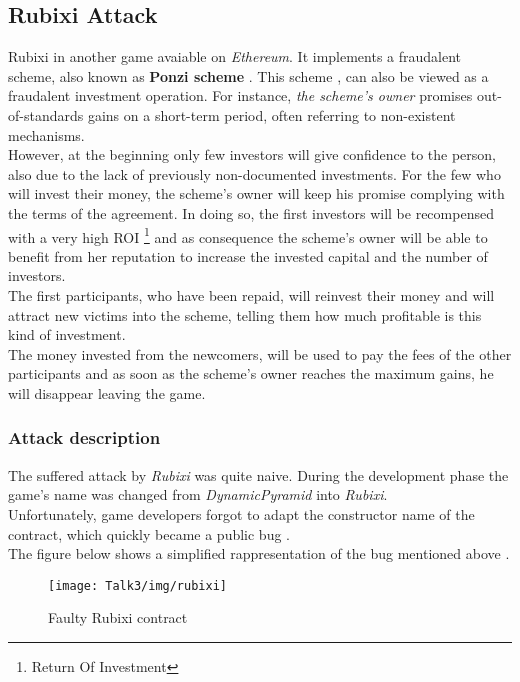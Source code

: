 \subsection{Rubixi Attack}
Rubixi \cite{rubixi1, rubixi2} in another game avaiable on \textit{Ethereum}. It implements a fraudalent scheme, also known as \textbf{Ponzi scheme} \cite{paper2}.
This scheme \cite{ponzi}, can also be viewed as a fraudalent investment operation. For instance, \textit{the scheme's owner} promises out-of-standards gains on a short-term period, often referring to non-existent mechanisms. \\ 
However, at the beginning only few investors will give confidence to the person, also due to the lack of previously non-documented investments. 
For the few who will invest their money, the scheme's owner will keep his promise complying with the terms of the agreement. In doing so, the first investors will be recompensed with a very high ROI \footnote{Return Of Investment} and as consequence the scheme's owner will be able to benefit from her reputation to increase the invested capital and the number of investors. \\
The first participants, who have been repaid, will reinvest their money and will attract new victims into the scheme, telling them how much profitable is this kind of investment. \\
The money invested from the newcomers, will be used to pay the fees of the other participants and as soon as the scheme's owner reaches the maximum gains, he will disappear leaving the game. \\
\subsubsection{Attack description}
The suffered attack by \textit{Rubixi} was quite naive. During the development phase the game's name was changed from \textit{DynamicPyramid} into \textit{Rubixi}. \\
Unfortunately, game developers forgot to adapt the constructor name of the contract, which quickly became a public bug \cite{paper2}. \\
The figure below shows a simplified rappresentation of the bug mentioned above \cite{paper2}.

\begin{figure}[H]
\begin{center}
\texttt{[image: Talk3/img/rubixi]}
\end{center}
\caption{Faulty Rubixi contract}
\label{label}
\end{figure}

